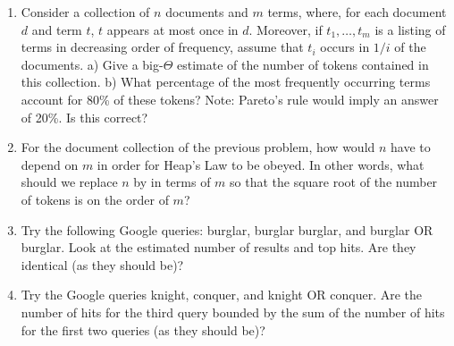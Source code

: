 \documentclass [12pt]{article}
\begin{document}
\begin{enumerate}
\item Consider a collection of $n$ documents and $m$ terms, where, for each document $d$ and term $t$, $t$ appears
at most once in $d$. Moreover, if $t_{1},\ldots,t_{m}$ is a listing of terms in decreasing order of frequency, assume that
$t_{i}$ occurs in $1/i$ of the documents. a) Give a big-$\Theta$ estimate of the number of tokens contained in this collection. b) What percentage of the most frequently occurring terms account for 80\% of these tokens? Note: Pareto's
rule would imply an answer of 20\%. Is this correct?

\item For the document collection of the previous problem, how would $n$ have to depend on $m$ in order for Heap's Law
to be obeyed. In other words, what should we replace $n$ by in terms of $m$ so that the square root of the number of
tokens is on the order of $m$? 

\item Try the following Google queries: burglar, burglar burglar, and 
burglar OR burglar. Look at the estimated number of results and top hits.
Are they identical (as they should be)?

\item Try the Google queries knight, conquer, and knight OR conquer.
Are the number of hits for the third query bounded by the sum of the number 
of hits for the first two queries (as they should be)?

\end{enumerate}
\end{document}
